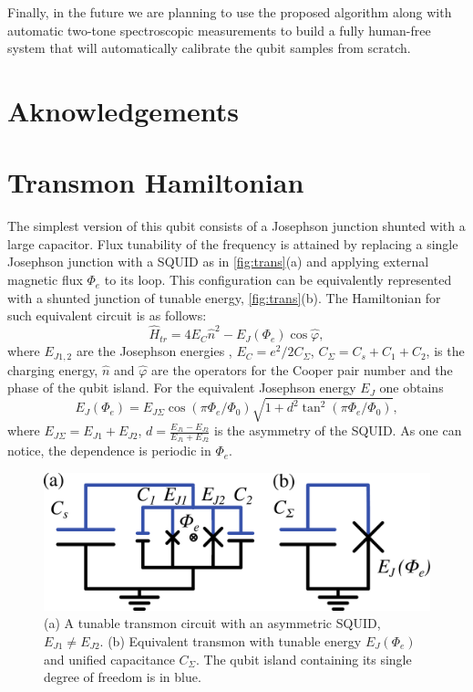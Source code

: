 \documentclass[%
 aip,
 draft,
 amsmath,amssymb,
 reprint,%
]{revtex4-1}
\begin{document}
Finally, in the future we are planning to use the proposed algorithm along with automatic two-tone spectroscopic measurements to build a fully human-free system that will automatically calibrate the qubit samples from scratch.


\section{Aknowledgements}


\appendix



\section{Transmon Hamiltonian}\label{sec:transmon}

The simplest version of this qubit consists of a Josephson junction shunted with a large capacitor. Flux tunability of the frequency is attained by replacing a single Josephson junction with a SQUID as in \autoref{fig:trans}(a) and applying external magnetic flux $\Phi_e$ to its loop. This configuration can be equivalently represented with a shunted junction of tunable energy, \autoref{fig:trans}(b). The Hamiltonian for such equivalent circuit is as follows: 
\begin{equation}
\hat{H}_{tr} = 4E_C \hat n^2 - E_J(\Phi_e) \cos \hat\varphi,
\label{eq:tr_ham}
\end{equation}
where $E_{J1,2}$ are the Josephson energies , $E_C = e^2/2C_{\Sigma}$, $C_{\Sigma} = C_s + C_1 +C_2$, is the charging energy, $\hat n$ and $\hat \varphi$ are the operators for the Cooper pair number and the phase of the qubit island. For the equivalent Josephson energy $E_{J}$ one obtains
\begin{equation}
E_{J}(\Phi_e) = E_{J\Sigma}\cos\left(\pi \Phi_e/\Phi_0\right) \sqrt{1+d^2 \tan^2 \left(\pi \Phi_e/\Phi_0\right)},
\label{eq:EJ_Phie}
\end{equation}  
where $E_{J\Sigma} = E_{J1}+E_{J2}$, $d = \frac{E_{J1}-E_{J2}}{E_{J1}+E_{J2}}$ is the asymmetry of the SQUID. As one can notice, the dependence is periodic in $\Phi_e$.
\begin{figure}[b]
	\centering
	\includegraphics[width=\linewidth]{transmon}
	\caption{(a) A tunable transmon circuit with an asymmetric SQUID, $E_{J1} \neq E_{J2}$. (b) Equivalent transmon with tunable energy $E_{J}(\Phi_e)$ and unified capacitance $C_{\Sigma}$. The qubit island containing its single degree of freedom is in blue.}
	\label{fig:trans}
\end{figure}
\end{document}
